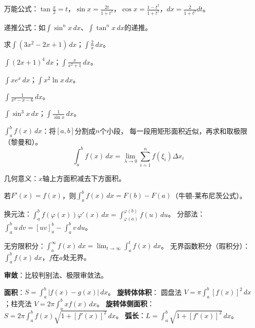 \documentclass[a4paper,12pt]{ctexart}
\begin{document}

万能公式：$\tan\frac{x}{2}=t$，$\sin x=\frac{2t}{1+t^2}$，$\cos x=\frac{1-t^2}{1+t^2}$，$dx=\frac{2}{1+t^2}dt$。

递推公式：如$\int\sin^nx\,dx$、$\int\tan^nx\,dx$的递推。


\begin{exercise}
\item 求$\int(3x^2-2x+1)\,dx$；$\int\frac{2}{x}\,dx$。
\item $\int(2x+1)^4\,dx$；$\int\frac{x}{x^2+1}\,dx$。
\item $\int x e^x\,dx$；$\int x^2\ln x\,dx$。
\item $\int\frac{1}{x^2-x-6}\,dx$。
\item $\int\sin^3x\,dx$；$\int\frac{1}{\sin x}\,dx$。
\end{exercise}

\newpage



$\int_a^b f(x)\,dx$：将$[a,b]$分割成$n$个小段，
每一段用矩形面积近似，再求和取极限（黎曼和）。
\[
\int_a^b f(x)\,dx = \lim_{\lambda\to0}\sum_{i=1}^n f(\xi_i)\Delta x_i
\]

几何意义：$x$轴上方面积减去下方面积。


若$F'(x)=f(x)$，则$\int_a^b f(x)\,dx = F(b)-F(a)$（牛顿-莱布尼茨公式）。


换元法：$\int_a^b f(\varphi(x))\varphi'(x)\,dx = \int_{\varphi(a)}^{\varphi(b)} f(u)\,du$。
分部法：$\int_a^b u\,dv=[uv]_a^b-\int_a^b v\,du$。


无穷限积分：$\int_a^\infty f(x)\,dx = \lim_{t\to\infty}\int_a^t f(x)\,dx$。
无界函数积分（瑕积分）：$\int_a^b f(x)\,dx$，$f$在$a$处无界。

\textbf{审敛}：比较判别法、极限审敛法。


\textbf{面积}：$S=\int_a^b|f(x)-g(x)|\,dx$。
\textbf{旋转体体积}：
圆盘法 $V=\pi\int_a^b[f(x)]^2\,dx$；柱壳法 $V=2\pi\int_a^b xf(x)\,dx$。
\textbf{旋转体侧面积}：$S=2\pi\int_a^b f(x)\sqrt{1+[f'(x)]^2}\,dx$。
\textbf{弧长}：$L=\int_a^b\sqrt{1+[f'(x)]^2}\,dx$。
\end{document}
